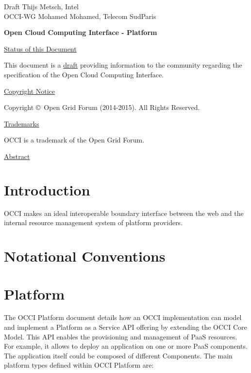 \documentclass[10pt,a4paper]{article}
\begin{document}
\thispagestyle{empty}

Draft \hfill  Thijs Metsch, Intel\\
OCCI-WG \hfill  Mohamed Mohamed, Telecom SudParis\\
\rightline {\today}

\vspace*{0.5in}

\begin{Large}
\textbf{Open Cloud Computing Interface - Platform}
\end{Large}

\vspace*{0.5in}

\underline{Status of this Document}

% 

This document is a \underline{draft} providing information to the community regarding the specification of the Open Cloud Computing Interface.

\underline{Copyright Notice}

Copyright \copyright ~Open Grid Forum (2014-2015). All Rights
Reserved.

\underline{Trademarks}

OCCI is a trademark of the Open Grid Forum.

\underline{Abstract}



\newpage
\tableofcontents
\newpage

\section{Introduction}


OCCI makes an ideal interoperable boundary interface between the web
and the internal resource management system of platform providers.

\section{Notational Conventions}



\section{Platform}

The OCCI Platform document details how an OCCI implementation can model and implement a Platform as a Service API offering by extending the OCCI Core Model. This API enables the provisioning and management of PaaS resources. For example, it allows to deploy an application on one or more PaaS components. The application itself could be composed of different Components. The main platform types defined within OCCI Platform are:
\end{document}
